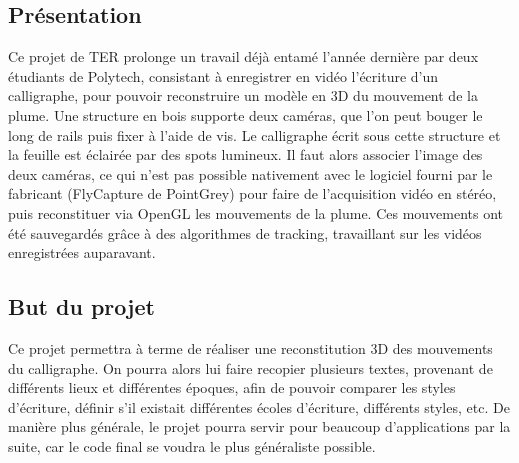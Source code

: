 \subsection{Présentation}

Ce projet de TER prolonge un travail déjà entamé l'année dernière par deux étudiants de Polytech, consistant à enregistrer en vidéo l'écriture d'un calligraphe, pour pouvoir reconstruire un modèle en 3D du mouvement de la plume. Une structure en bois supporte deux caméras, que l'on peut bouger le long de rails puis fixer à l'aide de vis. Le calligraphe écrit sous cette structure et la feuille est éclairée par des spots lumineux. Il faut alors associer l'image des deux caméras, ce qui n'est pas possible nativement avec le logiciel fourni par le fabricant (FlyCapture de PointGrey) pour faire de l'acquisition vidéo en stéréo, puis reconstituer via OpenGL les mouvements de la plume. Ces mouvements ont été sauvegardés grâce à des algorithmes de tracking, travaillant sur les vidéos enregistrées auparavant.



\subsection{But du projet}

Ce projet permettra à terme de réaliser une reconstitution 3D des mouvements du calligraphe. On pourra alors lui faire recopier plusieurs textes, provenant de différents lieux et différentes époques, afin de pouvoir comparer les styles d'écriture, définir s'il existait différentes écoles d'écriture, différents styles, etc. De manière plus générale, le projet pourra servir pour beaucoup d'applications par la suite, car le code final se voudra le plus généraliste possible.